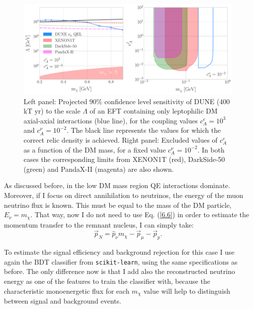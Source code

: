 \begin{figure}[t]
	\centering
	\includegraphics[width=1\linewidth]{Images/DM_Analysis/eft_bounds.pdf}
	\caption[Projected 90\% confidence level sensitivity of DUNE (400 kT yr) to the scale $\Lambda$ of an EFT containing only leptophilic DM axial-axial interactions.]{Left panel: Projected 90\% confidence level sensitivity of DUNE (400 kT yr) to the scale $\Lambda$ of an EFT containing only leptophilic DM axial-axial interactions (blue line), for the coupling values $c_{A}^{e} = 10^{3}$ and $c_{A}^{\nu} = 10^{-2}$. The black line represents the values for which the correct relic density is achieved. Right panel: Excluded values of $c_{A}^{e}$ as a function of the DM mass, for a fixed value $c_{A}^{\nu} = 10^{-2}$. In both cases the corresponding limits from XENON1T \cite{XENON2019} (red), DarkSide-50 \cite{DarkSide2022} (green) and PandaX-II \cite{PandaX-II2021} (magenta) are also shown.}
	\label{fig:eft_bounds}
\end{figure}

As discussed before, in the low DM mass region QE interactions dominate. Moreover, if I focus on direct annihilation to neutrinos, the energy of the muon neutrino flux is known. This must be equal to the mass of the DM particle, $E_{\nu} = m_{\chi}$. That way, now I do not need to use Eq. (\ref{6.6}) in order to estimate the momentum transfer to the remnant nucleus, I can simply take:
\begin{equation}\label{7.6}
	\vec{p}_{N} = \hat{p}_{\nu} m_{\chi} - \vec{p}_{\mu} - \vec{p}_{p}.
\end{equation}

To estimate the signal efficiency and background rejection for this case I use again the BDT classifier from \texttt{scikit-learn}, using the same specifications as before. The only difference now is that I add also the reconstructed neutrino energy as one of the features to train the classifier with, because the characteristic monoenergetic flux for each $m_{\chi}$ value will help to distinguish between signal and background events.

